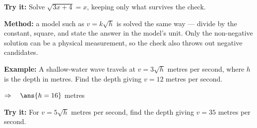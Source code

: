 \documentclass[12pt]{article}
\begin{document}
\begin{tryitbox}
\textbf{Try it:} \quad Solve $\sqrt{3x+4} = x$, keeping only what survives the
check.\\[2pt]
\end{tryitbox}


\begin{formulabox}
\textbf{Method:} a model such as $v = k\sqrt{h}$ is solved the same way ---
divide by the constant, square, and state the answer in the model's unit. Only
the non-negative solution can be a physical measurement, so the check also
throws out negative candidates.
\end{formulabox}

\begin{examplebox}
\textbf{Example:} \quad A shallow-water wave travels at $v = 3\sqrt{h}$ metres
per second, where $h$ is the depth in metres. Find the depth giving
$v = 12$ metres per second.

$\Rightarrow\quad \ans{h = 16}$ metres
\end{examplebox}

\begin{tryitbox}
\textbf{Try it:} \quad For $v = 5\sqrt{h}$ metres per second, find the depth
giving $v = 35$ metres per second.\\[2pt]
\end{tryitbox}
\end{document}
